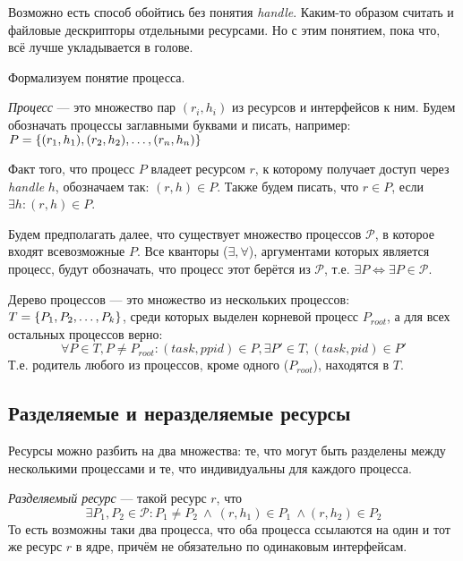 \begin{note}
Возможно есть способ обойтись без понятия \emph{handle}. Каким-то образом считать и файловые дескрипторы отдельными ресурсами. Но с этим понятием, пока что, всё лучше укладывается в голове.
\end{note}

Формализуем понятие процесса.

\begin{defn}
\emph{Процесс} --- это множество пар $(r_i, h_i)$ из ресурсов и интерфейсов к ним. Будем обозначать процессы заглавными буквами и писать, например: $P = \left\lbrace (r_1, h_1), (r_2, h_2), \ldots, (r_n, h_n) \right\rbrace$
\end{defn}

Факт того, что процесс $P$ владеет ресурсом $r$, к которому получает доступ через \textit{handle} $h$, обозначаем так: $(r, h) \in P$. Также будем писать, что $r \in P$, если $\exists h: (r, h) \in P$.

Будем предполагать далее, что существует множество процессов $\mathcal{P}$, в которое входят всевозможные $P$. Все кванторы ($\exists, \forall$), аргументами которых является процесс, будут обозначать, что процесс этот берётся из $\mathcal{P}$, т.е. $\exists P \Longleftrightarrow \exists P \in \mathcal{P}$.

\begin{defn}
Дерево процессов --- это множество из нескольких процессов: $T = \left\lbrace P_1, P_2, \ldots, P_k \right\rbrace$, среди которых выделен корневой процесс $P_{root}$, а для всех остальных процессов верно:
\begin{equation*}
\forall P \in T, P \neq P_{root}: (task, ppid) \in P, \exists P' \in T, (task, pid) \in P'
\end{equation*}
Т.е. родитель любого из процессов, кроме одного ($P_{root}$), находятся в $T$.
\end{defn}

\subsection{Разделяемые и неразделяемые ресурсы}

Ресурсы можно разбить на два множества: те, что могут быть разделены между несколькими процессами и те, что индивидуальны для каждого процесса.

\begin{defn}
\emph{Разделяемый ресурс} --- такой ресурс $r$, что
\begin{equation*}
\exists P_1, P_2 \in \mathcal{P}: P_1 \neq P_2\ \land\ (r, h_1) \in P_1\ \land (r, h_2) \in P_2
\end{equation*}
 То есть возможны таки два процесса, что оба процесса ссылаются на один и тот же ресурс $r$ в ядре, причём не обязательно по одинаковым интерфейсам.
\end{defn}

